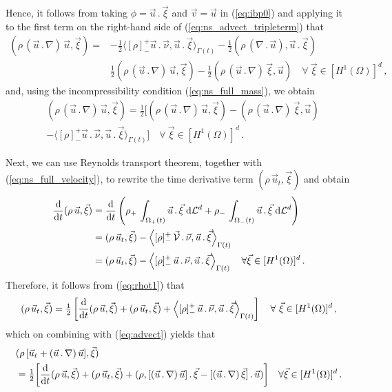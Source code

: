 Hence, it follows from taking $\phi = \vec u\,.\,\vec\xi$ and $\vec v = \vec u$
in (\ref{eq:ibp0}) and applying it to the first term on the right-hand side of
(\ref{eq:ns_advect_tripleterm}) that
\begin{align}\label{eq:fulladvect}
( \rho\,(\vec u \,.\,\nabla)\,\vec u, \vec \xi) = &
-\tfrac{1}{2}\langle [\rho]_-^+\vec u\,.\,\vec \nu, \vec u\,.\,\vec \xi
\rangle_{\Gamma(t)}
-\tfrac{1}{2}(\rho\,(\nabla\,.\,\vec u ),\vec u\,.\,\vec\xi) \nonumber \\
& \tfrac{1}{2}(\rho\,(\vec u\,.\,\nabla)\,\vec u, \vec \xi)
-\tfrac{1}{2}(\rho\,(\vec u\,.\,\nabla)\,\vec \xi,\vec u)
\quad \forall\ \vec \xi \in [H^1(\Omega)]^d\,,
\end{align}
and, using the incompressibility condition (\ref{eq:ns_full_mass}), we obtain
\begin{align}\label{eq:advect}
& ( \rho\,(\vec u \,.\,\nabla)\,\vec u, \vec \xi)
= \tfrac{1}{2} [ (\rho\,(\vec u\,.\,\nabla)\,\vec u, \vec \xi) -
(\rho\,(\vec u\,.\,\nabla)\,\vec \xi,\vec u) \nonumber \\
& -\langle [\rho]_-^+\vec u\,.\,\vec \nu, \vec u\,.\,\vec \xi
\rangle_{\Gamma(t)}] \quad \forall\ \vec \xi \in [H^1(\Omega)]^d\,.
\end{align}

Next, we can use Reynolds transport theorem, together with
(\ref{eq:ns_full_velocity}), to rewrite the time derivative term
$(\rho\,\vec u_t,\vec \xi)$ and obtain
\begin{align}\label{eq:rhot1}
\frac{\rm d}{{\rm d}t}(\rho \,\vec u, \vec \xi) & =
\frac{\rm d}{{\rm d}t}\left(\rho_+\,\int_{\Omega_+(t)} \vec u \,.\,\vec \xi \;{\rm d}{\cal L}^{d}
+ \rho_-\,\int_{\Omega_-(t)} \vec u\,.\,\vec \xi \;{\rm d}{\cal L}^{d}  \right) \nonumber \\
& =  (\rho\,\vec u_t, \vec \xi)
-\left\langle [\rho]_-^+\,\vec{\mathcal{V}}\,.\,\vec\nu, \vec u \,.\,\vec \xi
\right\rangle_{\Gamma(t)} \nonumber \\
&= (\rho\,\vec u_t, \vec \xi)- \left\langle [\rho]_-^+\,\vec u\,.\,\vec \nu,
\vec u \,.\,\vec \xi \right\rangle_{\Gamma(t)}
\quad \forall \vec \xi \in [H^1(\Omega)]^d\,.
\end{align}
Therefore, it follows from (\ref{eq:rhot1}) that
\begin{equation*}
(\rho\,\vec u_t, \vec \xi) =
\tfrac{1}{2} \left[
\frac{\rm d}{{\rm d}t} (\rho\,\vec u,\vec \xi) + (\rho\,\vec u_t, \vec \xi)
+ \left\langle [\rho]_-^+\,\vec u\,.\,\vec \nu,
\vec u \,.\,\vec \xi \right\rangle_{\Gamma(t)}
\right]
\quad \forall\ \vec \xi \in [H^1(\Omega)]^d\,,
\end{equation*}
which on combining with (\ref{eq:advect}) yields that
\begin{align} \label{eq:rhot3}
& (\rho\,[\vec u_t + (\vec u\,.\,\nabla)\,\vec u], \vec \xi) \nonumber \\
& = \tfrac{1}{2}\bigg[ \frac{\rm d}{{\rm d}t} (\rho\,\vec u, \vec \xi)
+ (\rho\,\vec u_t, \vec \xi) + (\rho, [(\vec u\,.\,\nabla)\,\vec u]\,.\,\vec \xi
- [(\vec u\,.\,\nabla)\,\vec \xi]\,.\,\vec u) \bigg]
\quad \forall \vec \xi \in [H^1(\Omega)]^d\,.
\end{align}

